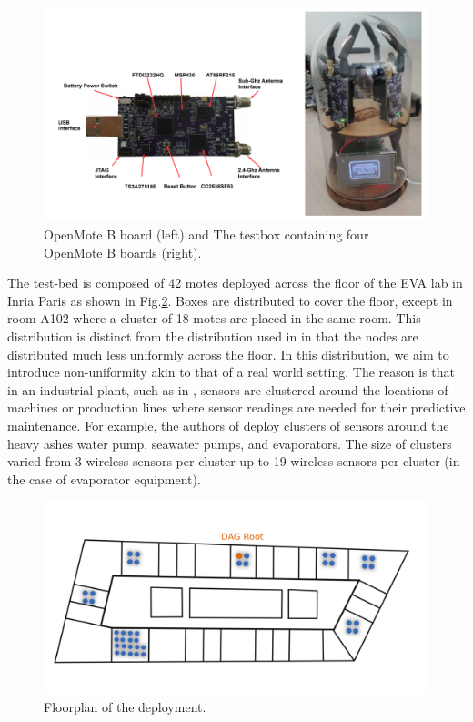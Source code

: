 \documentclass[journal]{IEEEtran}
\begin{document}
\begin{figure}
	\centering
	\includegraphics[width=0.90\columnwidth]{mote_ot}
	\caption{OpenMote B board (left) and The testbox containing four OpenMote B boards (right).}
    \label{fig:testbox}
\end{figure}


The test-bed is composed of 42 motes deployed across the floor of the EVA lab in Inria Paris as shown in Fig.\ref{fig:floorplan}.
Boxes are distributed to cover the floor, except in room A102 where a cluster of 18 motes are placed in the same room.
This distribution is distinct from the distribution used in \cite{brachmann19ieee} in that the nodes are distributed much less uniformly across the floor. 
In this distribution, we aim to introduce non-uniformity akin to that of a real world setting.
The reason is that in an industrial plant, such as in \cite{civerchia17industrial}, sensors are clustered around the locations of machines or production lines where sensor readings are needed for their predictive maintenance.
For example, the authors of \cite{civerchia17industrial} deploy clusters of sensors around the heavy ashes water pump, seawater pumps, and evaporators. 
The size of clusters varied from 3 wireless sensors per cluster up to 19 wireless sensors per cluster (in the case of evaporator equipment). 



\begin{figure}
	\centering
	\includegraphics[width=0.90\columnwidth]{building_motes}
	\caption{Floorplan of the deployment.}
    \label{fig:floorplan}
\end{figure}
\end{document}
